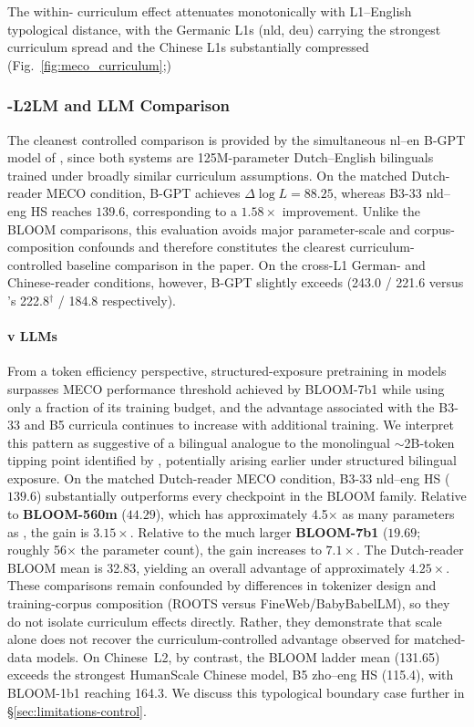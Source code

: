  The within-\beetle{} curriculum effect attenuates monotonically with L1--English typological distance, with the Germanic L1s (nld, deu) carrying the strongest curriculum spread and the Chinese L1s substantially compressed (Fig.~\ref{fig:meco_curriculum};)
 

\subsubsection{\beetle{}-L2LM and LLM Comparison} \label{sec:comparator-landscape}

The cleanest controlled comparison is provided by the simultaneous nl--en B-GPT model of \citet{arnett-etal-2025-acquisition}, since both systems are 125M-parameter Dutch--English bilinguals trained under broadly similar curriculum assumptions. On the matched Dutch-reader MECO condition, B-GPT achieves $\Delta\log L = 88.25$, whereas \beetle{} B3-33 nld--eng HS reaches $\mathbf{139.6}$, corresponding to a $\mathbf{1.58\times}$ improvement. Unlike the BLOOM comparisons, this evaluation avoids major parameter-scale and corpus-composition confounds and therefore constitutes the clearest curriculum-controlled baseline comparison in the paper. On the cross-L1 German- and Chinese-reader conditions, however, B-GPT slightly exceeds \beetle{} (243.0 / 221.6 versus \beetle{}'s 222.8$^{\dagger}$ / 184.8 respectively). 

\paragraph{\beetle{} v LLMs} From a token efficiency perspective, structured-exposure pretraining in \beetle{} models surpasses MECO performance threshold achieved by BLOOM-7b1 while using only a fraction of its training budget, and the advantage associated with the B3-33 and B5 curricula continues to increase with additional training. We interpret this pattern as suggestive of a bilingual analogue to the monolingual $\sim$2B-token tipping point identified by \citet{aoyama-wilcox-2025-language}, potentially arising earlier under structured bilingual exposure. On the matched Dutch-reader MECO condition, B3-33 nld--eng HS ($139.6$) substantially outperforms every checkpoint in the BLOOM family. Relative to \textbf{BLOOM-560m} ($44.29$), which has approximately 4.5$\times$ as many parameters as \beetle{}, the gain is $3.15\times$. Relative to the much larger \textbf{BLOOM-7b1} ($19.69$; roughly 56$\times$ the parameter count), the gain increases to $7.1\times$. The Dutch-reader BLOOM mean is 32.83, yielding an overall advantage of approximately $4.25\times$. These comparisons remain confounded by differences in tokenizer design and training-corpus composition (ROOTS versus FineWeb/BabyBabelLM), so they do not isolate curriculum effects directly. Rather, they demonstrate that scale alone does not recover the curriculum-controlled advantage observed for matched-data \beetle{} models. On Chinese~L2, by contrast, the BLOOM ladder mean (131.65) exceeds the strongest HumanScale \beetle{} Chinese model, B5 zho--eng HS (115.4), with BLOOM-1b1 reaching 164.3. We discuss this typological boundary case further in \S\ref{sec:limitations-control}.

